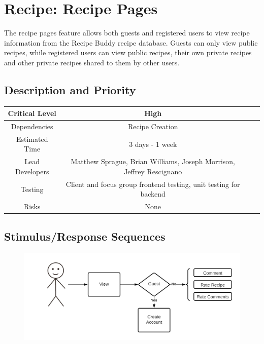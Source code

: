\documentclass{scrreprt}
\begin{document}
\section{Recipe: Recipe Pages}

The recipe pages feature allows both guests and registered users to view recipe information from the \gls{Recipe Buddy} recipe database. Guests can only view public recipes, while registered users can view public recipes, their own private recipes and other private recipes shared to them by other users.

\subsection{Description and Priority}
\begin{center}
    \begin{tabular}{| c | c | c | c |}
        \hline
        Critical Level  & High                                                                 \\
        \hline
        Dependencies    & Recipe Creation                                                      \\
        \hline
        Estimated Time  & 3 days - 1 week                                                      \\
        \hline
        Lead Developers & Matthew Sprague, Brian Williams, Joseph Morrison, Jeffrey Rescignano \\
        \hline
        Testing         & Client and focus group \gls{frontend} testing,
                          \gls{unit testing} for \gls{backend}                                 \\
        \hline
        Risks           & None                                                                 \\
        \hline
    \end{tabular}
\end{center}

\subsection{Stimulus/Response Sequences}

\begin{figure}[H]\centering
    \includegraphics[width=\columnwidth]{FlowCharts/Recipe-Pages.png}
\end{figure}
\end{document}
